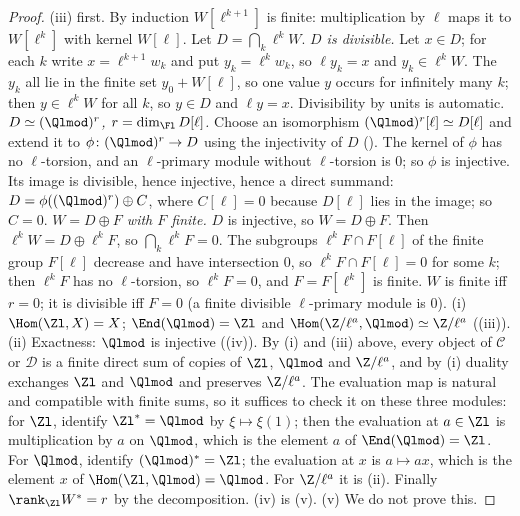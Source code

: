 \begin{proof}
(iii) first. By induction $W[\ell^{k+1}]$ is finite: multiplication by $\ell$ maps it to $W[\ell^k]$ with kernel $W[\ell]$. Let $D=\bigcap_k\ell^kW$.
\emph{$D$ is divisible.} Let $x\in D$; for each $k$ write $x=\ell^{k+1}w_k$ and put $y_k=\ell^kw_k$, so $\ell y_k=x$ and $y_k\in\ell^kW$. The $y_k$ all lie in
the finite set $y_0+W[\ell]$, so one value $y$ occurs for infinitely many $k$; then $y\in\ell^kW$ for all $k$, so $y\in D$ and $\ell y=x$. Divisibility by
units is automatic.
\emph{$D\simeq(\Qlmod)^r$, $r=\dim_{\Fl}D[\ell]$.} Choose an isomorphism $(\Qlmod)^r[\ell]\simeq D[\ell]$ and extend it to $\phi\colon(\Qlmod)^r\to D$ using the
injectivity of $D$ (). The kernel of $\phi$ has no $\ell$-torsion, and an $\ell$-primary module without $\ell$-torsion is $0$; so $\phi$ is
injective. Its image is divisible, hence injective, hence a direct summand: $D=\phi((\Qlmod)^r)\oplus C$, where $C[\ell]=0$ because $D[\ell]$ lies in the
image; so $C=0$.
\emph{$W=D\oplus F$ with $F$ finite.} $D$ is injective, so $W=D\oplus F$. Then $\ell^kW=D\oplus\ell^kF$, so $\bigcap_k\ell^kF=0$. The subgroups
$\ell^kF\cap F[\ell]$ of the finite group $F[\ell]$ decrease and have intersection $0$, so $\ell^kF\cap F[\ell]=0$ for some $k$; then $\ell^kF$ has no
$\ell$-torsion, so $\ell^kF=0$, and $F=F[\ell^k]$ is finite. $W$ is finite iff $r=0$; it is divisible iff $F=0$ (a finite divisible $\ell$-primary module is $0$).
(i) $\Hom(\Zl,X)=X$; $\End(\Qlmod)=\Zl$ and $\Hom(\Z/\ell^a,\Qlmod)\simeq\Z/\ell^a$ ((iii)).
(ii) Exactness: $\Qlmod$ is injective ((iv)). By (i) and (iii) above, every object of $\mathcal C$ or
$\mathcal D$ is a finite direct sum of copies of $\Zl$, $\Qlmod$ and $\Z/\ell^a$, and by (i) duality exchanges $\Zl$ and $\Qlmod$ and preserves $\Z/\ell^a$. The
evaluation map is natural and compatible with finite sums, so it suffices to check it on these three modules: for $\Zl$, identify $\Zl^*=\Qlmod$ by
$\xi\mapsto\xi(1)$; then the evaluation at $a\in\Zl$ is multiplication by $a$ on $\Qlmod$, which is the element $a$ of $\End(\Qlmod)=\Zl$. For $\Qlmod$, identify
$(\Qlmod)^*=\Zl$; the evaluation at $x$ is $a\mapsto ax$, which is the element $x$ of $\Hom(\Zl,\Qlmod)=\Qlmod$. For $\Z/\ell^a$ it is
(ii). Finally $\rank_{\Zl}W^*=r$ by the decomposition.
(iv) is (v). (v) We do not prove this.
\end{proof}

